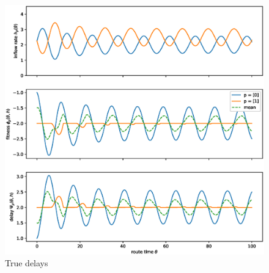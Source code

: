 \documentclass[10pt]{beamer}
\begin{document}
\begin{frame}
  

	\begin{center}
		\begin{figure}
			\includegraphics[scale=0.3]{img/pres-replicator_true_tt.eps}
			\caption{True delays}	
		\end{figure}	  
	\end{center}  

\end{frame}
\end{document}
